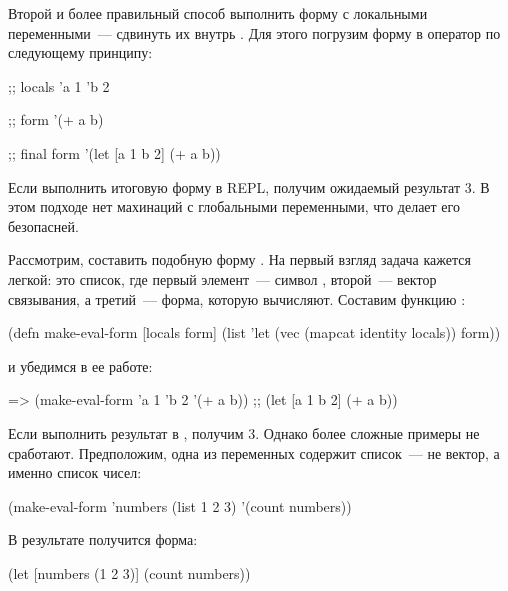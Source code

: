 Второй и более правильный способ выполнить форму с локальными переменными~--- сдвинуть их внутрь . Для этого погрузим форму в оператор  по следующему принципу:

\begin{english}
  \begin{clojure}
;; locals
{'a 1 'b 2}

;; form
'(+ a b)

;; final form
'(let [a 1 b 2]
   (+ a b))
  \end{clojure}
\end{english}

Если выполнить итоговую форму в REPL, получим ожидаемый результат 3. В этом подходе нет махинаций с глобальными переменными, что делает его безопасней.

Рассмотрим, составить подобную форму . На первый взгляд задача кажется легкой: это список, где первый элемент~--- символ , второй~--- вектор связывания, а третий~--- форма, которую вычисляют. Составим функцию :

\begin{english}
  \begin{clojure}
(defn make-eval-form [locals form]
  (list 'let (vec (mapcat identity locals)) form))
  \end{clojure}
\end{english}

\noindent
и убедимся в ее работе:

\begin{english}
  \begin{clojure}
=> (make-eval-form {'a 1 'b 2} '(+ a b))
;; (let [a 1 b 2] (+ a b))
  \end{clojure}
\end{english}

Если выполнить результат в , получим 3. Однако более сложные примеры не сработают. Предположим, одна из переменных содержит список~--- не вектор, а именно список чисел:

\begin{english}
  \begin{clojure}
(make-eval-form {'numbers (list 1 2 3)}
                '(count numbers))
  \end{clojure}
\end{english}

В результате получится форма:

\begin{english}
  \begin{clojure}
(let [numbers (1 2 3)]
  (count numbers))
  \end{clojure}
\end{english}


